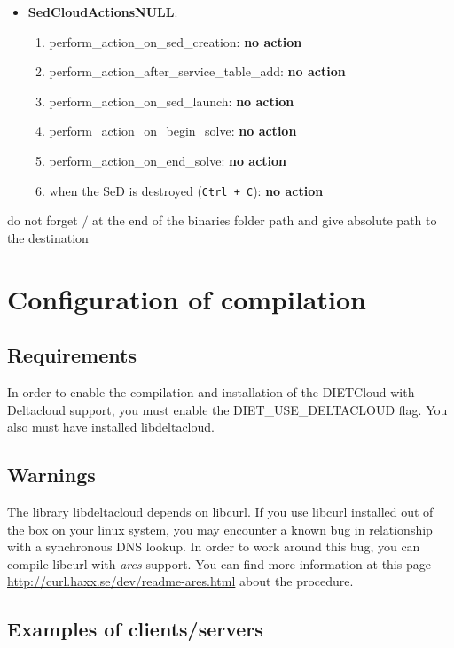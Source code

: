 \begin{itemize}
  \item \textbf{SedCloudActionsNULL}:
    \begin{enumerate}
        \item perform\_action\_on\_sed\_creation: \textbf{no action}
        \item perform\_action\_after\_service\_table\_add: \textbf{no action}
        \item perform\_action\_on\_sed\_launch: \textbf{no action}
        \item perform\_action\_on\_begin\_solve: \textbf{no action}
        \item perform\_action\_on\_end\_solve: \textbf{no action}
        \item when the SeD is destroyed (\texttt{Ctrl + C}): \textbf{no action}
   \end{enumerate}
\end{itemize}

do not forget $/$ at the end of the binaries folder path and give absolute path to the destination

\section{Configuration of compilation}

\subsection{Requirements}

In order to enable the compilation and installation of the DIETCloud
with Deltacloud support, you must enable the DIET\_USE\_DELTACLOUD
flag. You also must have installed libdeltacloud.

\subsection{Warnings}

The library libdeltacloud depends on libcurl. If you use libcurl
installed out of the box on your linux system, you may encounter a known bug
in relationship with a synchronous DNS lookup. In order to work around
this bug, you can compile libcurl with \emph{ares} support. You can find more
information at this page
\url{http://curl.haxx.se/dev/readme-ares.html} about the procedure.

\subsection{Examples of clients/servers}

